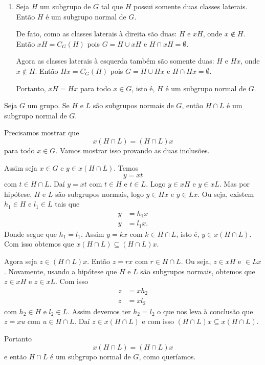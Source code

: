 \begin{exemplos}
\begin{enumerate}[label={\arabic*})]
        \item Seja $H$ um subgrupo de $G$ tal que $H$ possui somente duas classes laterais. Então $H$ é um subgrupo normal de $G$.
        \begin{solucao}
            De fato, como as classes laterais à direita são duas: $H$ e $xH$, onde $x \notin H$. Então $xH = C_G(H)$ pois $G = H \cup xH$ e $H \cap xH = \emptyset$.

            Agora as classes laterais à esquerda também são somente duas: $H$ e $Hx$, onde $x \notin H$. Então $Hx = C_G(H)$ pois $G = H \cup Hx$ e $H \cap Hx = \emptyset$.

            Portanto, $xH = Hx$ para todo $x \in G$, isto é, $H$ é um subgrupo normal de $G$.
        \end{solucao}
    \end{enumerate}
\end{exemplos}

\begin{proposicao}
    Seja $G$ um grupo. Se $H$ e $L$ são subgrupos normais de $G$, então $H \cap L$ é um subgrupo normal de $G$.
\end{proposicao}
\begin{prova}
    Precisamos mostrar que
    \[
        x(H\cap L) = (H \cap L)x
    \]
    para todo $x \in G$. Vamos mostrar isso provando as duas inclusões.

    Assim seja $x \in G$ e $y \in x(H\cap L)$. Temos
    \[
        y = xt
    \]
    com $t \in H\cap L$. Daí $y = xt$ com $t \in H$ e $t \in L$. Logo $y \in xH$ e $y \in xL$. Mas por hipótese, $H$ e $L$ são subgrupos normais, logo $y \in Hx$ e $y \in Lx$. Ou seja, existem $h_1 \in H$ e $l_1 \in L$ tais que
    \begin{align*}
        y &= h_1x\\
        y &= l_1x.
    \end{align*}
    Donde segue que $h_1 = l_1$. Assim $y = kx$ com $k \in H\cap L$, isto é, $y \in x(H\cap L)$. Com isso obtemos que $x(H\cap L) \subseteq (H\cap L)x$.

    Agora seja $z \in (H\cap L)x$. Então $z = rx$ com $r \in H\cap L$. Ou seja, $z \in xH$ e $ \in Lx$. Novamente, usando a hipótese que $H$ e $L$ são subgrupos normais, obtemos que $z \in xH$ e $z \in xL$. Com isso
    \begin{align*}
        z &= xh_2\\
        z &= xl_2
    \end{align*}
    com $h_2 \in H$ e $l_2 \in L$. Assim devemos ter $h_2 = l_2$ o que nos leva à conclusão que $z = xu$ com $u \in H\cap L$. Daí $z \in x(H \cap L)$ e com isso $(H \cap L)x \subseteq x(H \cap L)$.

    Portanto
    \[
        x(H \cap L) = (H \cap L)x
    \]
    e então $H \cap L$ é um subgrupo normal de $G$, como queríamos.
\end{prova}

